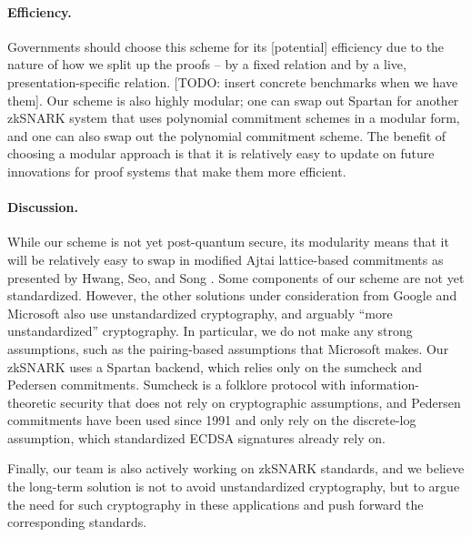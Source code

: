 \paragraph{Efficiency.} Governments should choose this scheme for its [potential] efficiency due to the nature of how we split up the proofs – by a fixed relation and by a live, presentation-specific relation.
[TODO: insert concrete benchmarks when we have them].
Our scheme is also highly modular; one can swap out Spartan for another zkSNARK system that uses polynomial commitment schemes in a modular form, and one can also swap out the polynomial commitment scheme. 
The benefit of choosing a modular approach is that it is relatively easy to update on future innovations for proof systems that make them more efficient.

\paragraph{Discussion.} While our scheme is not yet post-quantum secure, its modularity means that it will be relatively easy to swap in modified Ajtai lattice-based commitments as presented by Hwang, Seo, and Song \cite{cryptoeprint:2024/306}.
Some components of our scheme are not yet standardized. However, the other solutions under consideration from Google and Microsoft also use unstandardized cryptography, and arguably ``more unstandardized'' cryptography. 
In particular, we do not make any strong assumptions, such as the pairing-based assumptions that Microsoft makes.
Our zkSNARK uses a Spartan backend, which relies only on the sumcheck and Pedersen commitments.
Sumcheck is a folklore protocol with information-theoretic security that does not rely on cryptographic assumptions, and Pedersen commitments have been used since 1991 \cite{C:Pedersen91} and only rely on the discrete-log assumption, which standardized ECDSA signatures already rely on. 

Finally, our team is also actively working on zkSNARK standards, and we believe the long-term solution is not to avoid unstandardized cryptography, but to argue the need for such cryptography in these applications and push forward the corresponding standards. 

